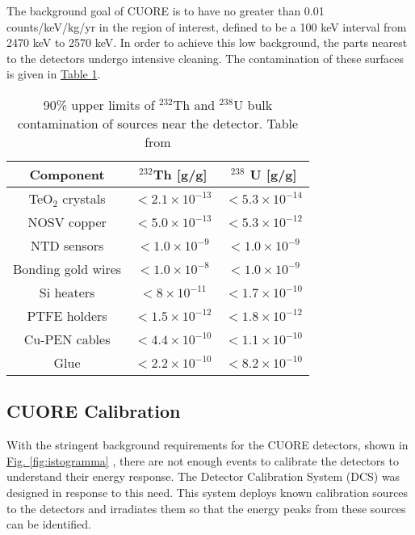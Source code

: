 \documentclass[12pt,a4paper]{article}
\begin{document}
The background goal of CUORE is to have no greater than 0.01 counts/keV/kg/yr in the region of interest, defined to be a 100 keV interval from 2470 keV to 2570 keV. In order to achieve this low background, the parts nearest to the detectors undergo intensive cleaning. The contamination of these surfaces is given in \hyperref[tab:NearDetectorSources]{Table \ref*{tab:NearDetectorSources}}.

\begin{table}[htbp]
\centering
\caption[90\% upper limits of $^{232}$Th and $^{238}$U bulk contamination of sources near the detector.]{90\% upper limits of $^{232}$Th and $^{238}$U bulk contamination of sources near the detector. Table from \cite{Alduino:2016vjd}}
\label{tab:NearDetectorSources}
\begin{tabular}{|c|c|c|}
\hline 
 Component & $^{232}$Th [g/g] & $^{238}$ U [g/g] \\ 
\hline 
TeO$_2$ crystals & $< 2.1\times 10^{-13}$ & $<5.3\times 10^{-14}$ \\ 
\hline 
NOSV copper & $<5.0 \times 10^{-13}$ & $<5.3 \times 10^{-12}$ \\ 
\hline 
NTD sensors & $< 1.0 \times 10^{-9}$ & $<1.0 \times 10^{-9}$ \\ 
\hline 
Bonding gold wires & $< 1.0 \times 10^{-8}$ & $<1.0 \times 10^{-9}$ \\ 
\hline 
Si heaters &   $<8\times 10^{-11}$ & $<1.7 \times 10^{-10}$ \\ 
\hline 
PTFE holders & $<1.5\times 10^{-12}$ & $<1.8 \times 10^{-12}$ \\ 
\hline 
Cu-PEN cables & $<4.4\times 10^{-10}$ & $<1.1 \times 10^{-10}$ \\ 
\hline
Glue & $<2.2\times 10^{-10}$ & $<8.2\times10^{-10}$ \\
\hline 
\end{tabular} 
\end{table}

\subsection{CUORE Calibration}

With the stringent background requirements for the CUORE detectors, shown in \hyperref[fig:istogramma]{Fig. \ref*{fig:istogramma}} , there are not enough events to calibrate the detectors to understand their energy response. The Detector Calibration System (DCS) was designed in response to this need. This system deploys known calibration sources to the detectors and irradiates them so that the energy peaks from these sources can be identified. 
\end{document}

